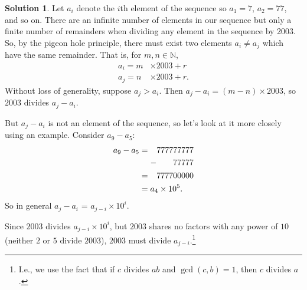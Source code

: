 \documentclass{article}
\theoremstyle{definition}
\newtheorem{sol}{Solution}
\theoremstyle{plain}
\begin{document}
\begin{sol}
Let $a_i$ denote the $i$th element of the sequence so $a_1 = 7$, $a_2 = 77$, and so on. There are an infinite number of elements in our sequence but only a finite number of remainders when dividing any element in the sequence by 2003. So, by the pigeon hole principle, there must exist two elements $a_i \ne a_j$ which have the same remainder. That is, for $m,n \in \mathbb{N}$,
\begin{align*}
a_i = m &\times 2003 + r\\
a_j = n &\times 2003 + r.
\end{align*}
Without loss of generality, suppose $a_j > a_i$. Then $a_j - a_i = (m-n) \times 2003$, so $2003$ divides $a_j - a_i$.

But $a_j - a_i$ is not an element of the sequence, so let's look at it more closely using an example. Consider $a_{9} - a_{5}$:
\begin{align*}
a_9 - a_5 &= \begin{aligned}[t] &777777777\\ -&\hphantom{0000}77777\end{aligned}\\
&= \hphantom{-} 777700000\\
&= a_4 \times 10^5.
\end{align*}
So in general $a_j - a_i$ = $a_{j-i} \times 10^i$.

Since $2003$ divides $a_{j-i} \times 10^i$, but $2003$ shares no factors with any power of $10$ (neither $2$ or $5$ divide $2003$), $2003$ must divide $a_{j-i}$.\footnote{I.e., we use the fact that if $c$ divides $ab$ and $\gcd(c,b) = 1$, then $c$ divides $a$.}
\end{sol}
\end{document}
